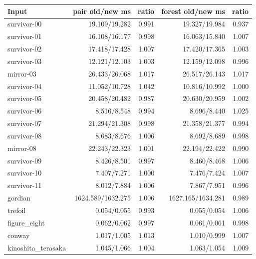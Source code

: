 \begin{center}\small
\begin{tabular}{@{}lrrrr@{}}
\toprule
Input & pair old/new ms & ratio & forest old/new ms & ratio \\
\midrule
survivor-00 & 19.109/19.282 & 0.991 & 19.327/19.984 & 0.937 \\
survivor-01 & 16.108/16.177 & 0.998 & 16.063/15.840 & 1.007 \\
survivor-02 & 17.418/17.428 & 1.007 & 17.420/17.365 & 1.003 \\
survivor-03 & 12.121/12.103 & 1.003 & 12.159/12.098 & 0.996 \\
mirror-03 & 26.433/26.068 & 1.017 & 26.517/26.143 & 1.017 \\
survivor-04 & 11.052/10.728 & 1.042 & 10.816/10.992 & 1.000 \\
survivor-05 & 20.458/20.482 & 0.987 & 20.630/20.959 & 1.002 \\
survivor-06 & 8.516/8.548 & 0.994 & 8.696/8.440 & 1.025 \\
survivor-07 & 21.294/21.308 & 0.998 & 21.358/21.377 & 0.994 \\
survivor-08 & 8.683/8.676 & 1.006 & 8.692/8.689 & 0.998 \\
mirror-08 & 22.243/22.323 & 1.001 & 22.194/22.422 & 0.990 \\
survivor-09 & 8.426/8.501 & 0.997 & 8.460/8.468 & 1.006 \\
survivor-10 & 7.407/7.271 & 1.000 & 7.476/7.424 & 1.007 \\
survivor-11 & 8.012/7.884 & 1.006 & 7.867/7.951 & 0.996 \\
gordian & 1624.589/1632.275 & 1.006 & 1627.165/1634.281 & 0.989 \\
trefoil & 0.054/0.055 & 0.993 & 0.055/0.054 & 1.006 \\
figure\_eight & 0.062/0.062 & 0.997 & 0.061/0.061 & 0.998 \\
conway & 1.017/1.005 & 1.013 & 1.010/0.999 & 1.007 \\
kinoshita\_terasaka & 1.045/1.066 & 1.004 & 1.063/1.054 & 1.009 \\
\bottomrule
\end{tabular}
\end{center}
